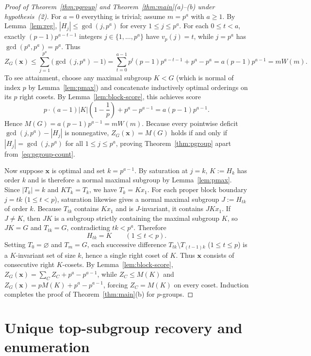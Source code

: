 \documentclass[11pt,reqno]{amsart}
\numberwithin{equation}{section}
\theoremstyle{definition}
\theoremstyle{remark}
\begin{document}
\begin{proof}[Proof of Theorem~\ref{thm:pgroup} and Theorem~\ref{thm:main}(a)--(b) under hypothesis~(2)]
For $a=0$ everything is trivial; assume $m=p^a$ with $a\ge 1$. By Lemma~\ref{lem:reg}, $|H_j|\le \gcd(j,p^a)$ for every $1\le j\le p^a$. For each $0\le t<a$, exactly $(p-1)p^{a-t-1}$ integers $j\in\{1,\ldots,p^a\}$ have $v_p(j)=t$, while $j=p^a$ has $\gcd(p^a,p^a)=p^a$. Thus
\[
Z_G(\mathbf{x}) \le \sum_{j=1}^{p^a}\bigl(\gcd(j,p^a)-1\bigr)
= \sum_{t=0}^{a-1} p^t (p-1)p^{a-t-1} + p^a - p^a
= a(p-1)p^{a-1} = mW(m).
\]
To see attainment, choose any maximal subgroup $K<G$ (which is normal of index $p$ by Lemma~\ref{lem:pmax}) and concatenate inductively optimal orderings on its $p$ right cosets. By Lemma~\ref{lem:block-score}, this achieves score
\[
p\cdot (a-1)|K|\!\left(1-\frac{1}{p}\right) + p^a - p^{a-1} = a(p-1)p^{a-1}.
\]
Hence $M(G)=a(p-1)p^{a-1}=mW(m)$. Because every pointwise deficit $\gcd(j,p^a)-|H_j|$ is nonnegative, $Z_G(\mathbf{x})=M(G)$ holds if and only if $|H_j|=\gcd(j,p^a)$ for all $1\le j\le p^a$, proving Theorem~\ref{thm:pgroup} apart from~\eqref{eq:pgroup-count}.

Now suppose $\mathbf{x}$ is optimal and set $k=p^{a-1}$. By saturation at $j=k$, $K:=H_k$ has order $k$ and is therefore a normal maximal subgroup by Lemma~\ref{lem:pmax}. Since $|T_k|=k$ and $K T_k = T_k$, we have $T_k = Kx_1$. For each proper block boundary $j=tk$ ($1\le t<p$), saturation likewise gives a normal maximal subgroup $J:=H_{tk}$ of order $k$. Because $T_{tk}$ contains $Kx_1$ and is $J$-invariant, it contains $JKx_1$. If $J\neq K$, then $JK$ is a subgroup strictly containing the maximal subgroup $K$, so $JK=G$ and $T_{tk}=G$, contradicting $tk<p^a$. Therefore
\[
H_{tk} = K \qquad (1\le t<p).
\]
Setting $T_0=\varnothing$ and $T_m=G$, each successive difference $T_{tk}\setminus T_{(t-1)k}$ ($1\le t\le p$) is a $K$-invariant set of size $k$, hence a single right coset of $K$. Thus $\mathbf{x}$ consists of consecutive right $K$-cosets. By Lemma~\ref{lem:block-score}, $Z_G(\mathbf{x}) = \sum_C Z_C + p^a - p^{a-1}$, while $Z_C\le M(K)$ and $Z_G(\mathbf{x})=pM(K)+p^a-p^{a-1}$, forcing $Z_C=M(K)$ on every coset. Induction completes the proof of Theorem~\ref{thm:main}(b) for $p$-groups.
\end{proof}

\section{Unique top-subgroup recovery and enumeration}
\label{sec:count}
\end{document}
